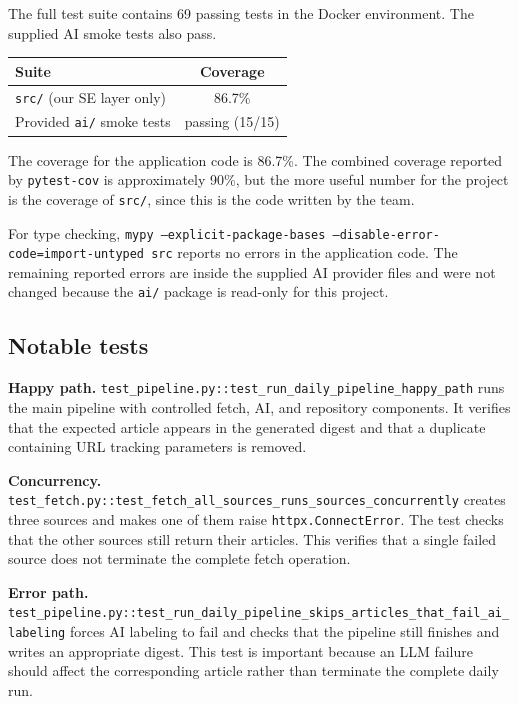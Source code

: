 \documentclass[11pt,a4paper]{article}
\begin{document}
The full test suite contains 69 passing tests in the Docker environment. The supplied AI smoke tests also pass.

\begin{center}
\small
\begin{tabular}{lc}
\toprule
\textbf{Suite} & \textbf{Coverage} \\
\midrule
\texttt{src/} (our SE layer only) & 86.7\% \\
Provided \texttt{ai/} smoke tests & \textcolor{codegreen}{passing (15/15)} \\
\bottomrule
\end{tabular}
\end{center}

The coverage for the application code is 86.7\%. The combined coverage reported by \texttt{pytest-cov} is approximately 90\%, but the more useful number for the project is the coverage of \texttt{src/}, since this is the code written by the team.

For type checking, \texttt{mypy --explicit-package-bases --disable-error-code=import-untyped src} reports no errors in the application code. The remaining reported errors are inside the supplied AI provider files and were not changed because the \texttt{ai/} package is read-only for this project.

\subsection{Notable tests}

\textbf{Happy path.}
\texttt{test\_pipeline.py::test\_run\_daily\_pipeline\_happy\_path} runs the main pipeline with controlled fetch, AI, and repository components. It verifies that the expected article appears in the generated digest and that a duplicate containing URL tracking parameters is removed.

\textbf{Concurrency.}
\texttt{test\_fetch.py::test\_fetch\_all\_sources\_runs\_sources\_concurrently} creates three sources and makes one of them raise \texttt{httpx.ConnectError}. The test checks that the other sources still return their articles. This verifies that a single failed source does not terminate the complete fetch operation.

\textbf{Error path.}
\texttt{test\_pipeline.py::test\_run\_daily\_pipeline\_skips\_articles\_that\_fail\_ai\_labeling} forces AI labeling to fail and checks that the pipeline still finishes and writes an appropriate digest. This test is important because an LLM failure should affect the corresponding article rather than terminate the complete daily run.
\end{document}

